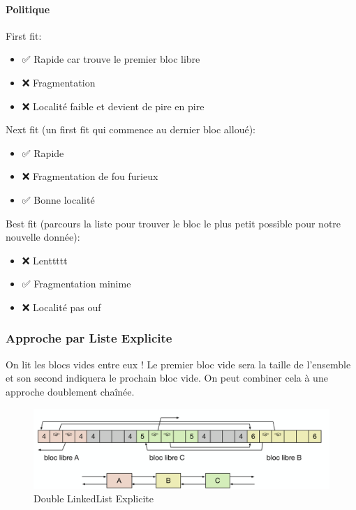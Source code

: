 \paragraph{Politique}\label{politique}

First fit:

\begin{itemize}
\tightlist
\item
  ✅ Rapide car trouve le premier bloc libre
\item
  ❌ Fragmentation
\item
  ❌ Localité faible et devient de pire en pire
\end{itemize}

Next fit (un first fit qui commence au dernier bloc alloué):

\begin{itemize}
\tightlist
\item
  ✅ Rapide
\item
  ❌ Fragmentation de fou furieux
\item
  ✅ Bonne localité
\end{itemize}

Best fit (parcours la liste pour trouver le bloc le plus petit possible
pour notre nouvelle donnée):

\begin{itemize}
\tightlist
\item
  ❌ Lenttttt
\item
  ✅ Fragmentation minime
\item
  ❌ Localité pas ouf
\end{itemize}

\subsubsection{Approche par Liste
Explicite}\label{approche-par-liste-explicite}

On lit les blocs vides entre eux ! Le premier bloc vide sera la taille
de l'ensemble et son second indiquera le prochain bloc vide. On peut
combiner cela à une approche doublement chaînée.

\begin{figure}
\centering
\includegraphics{image-51.png}
\caption{Double LinkedList Explicite}
\end{figure}

